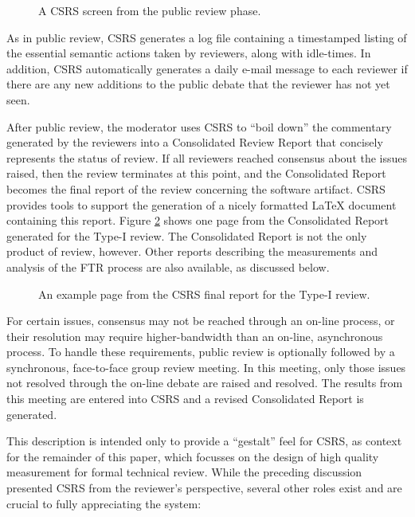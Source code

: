 \begin{figure}
 {\centerline{}}
\caption{A CSRS screen from the public review phase.}
\label{fig:public-screen}
\end{figure}

As in public review, CSRS generates a log file containing a timestamped
listing of the essential semantic actions taken by reviewers, along with
idle-times.  In addition, CSRS automatically generates a daily e-mail
message to each reviewer if there are any new additions to the public
debate that the reviewer has not yet seen.

After public review, the moderator uses CSRS to ``boil down'' the
commentary generated by the reviewers into a Consolidated Review Report
that concisely represents the status of review. If all reviewers reached
consensus about the issues raised, then the review terminates at this
point, and the Consolidated Report becomes the final report of the review
concerning the software artifact. CSRS provides tools to support the
generation of a nicely formatted LaTeX document containing this report.
Figure \ref{fig:final-report} shows one page from the Consolidated Report
generated for the Type-I review.  The Consolidated Report is not the only
product of review, however. Other reports describing the measurements and
analysis of the FTR process are also available, as discussed below.

\begin{figure} 

\caption{An example page from the CSRS final report for the Type-I
review.}
\label{fig:final-report}
\end{figure}

For certain issues, consensus may not be reached through an on-line
process, or their resolution may require higher-bandwidth than an on-line,
asynchronous process.  To handle these requirements, public review is
optionally followed by a synchronous, face-to-face group review meeting.
In this meeting, only those issues not resolved through the on-line debate
are raised and resolved.  The results from this meeting are entered into
CSRS and a revised Consolidated Report is generated.

This description is intended only to provide a ``gestalt''
feel for CSRS, as context for the remainder of this paper, which
focusses on the design of high quality measurement for formal
technical review.  While the preceding discussion presented CSRS
from the reviewer's perspective, several other roles exist and
are crucial to fully appreciating the system:

